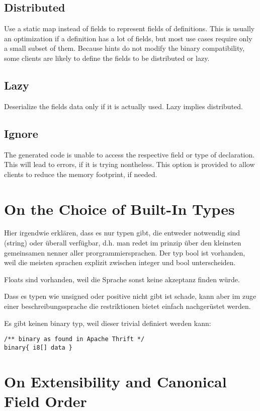 \documentclass[a4paper,10pt]{article}
\begin{document}
\subsection*{Distributed}
Use a static map instead of fields to represent fields of definitions. This is usually an optimization if a definition has a lot of fields, but most use cases require only a small subset of them. Because hints do not modify the binary compatibility, some clients are likely to define the fields to be distributed or lazy.

\subsection*{Lazy}
Deserialize the fields data only if it is actually used. Lazy implies distributed.

\subsection*{Ignore}
The generated code is unable to access the respective field or type of declaration. This will lead to errors, if it is trying nontheless. This option is provided to allow clients to reduce the memory footprint, if needed.

\section{On the Choice of Built-In Types}

Hier irgendwie erklären, dass es nur typen gibt, die entweder notwendig sind (string) oder überall verfügbar, d.h. man redet im prinzip über den kleinsten gemeinsamen nenner aller prorgrammiersprachen. Der typ bool ist vorhanden, weil die meisten sprachen explizit zwischen integer und bool unterscheiden.

Floats sind vorhanden, weil die Sprache sonst keine akzeptanz finden würde.

Dass es typen wie unsigned oder positive nicht gibt ist schade, kann aber im zuge einer beschreibungssprache die restriktionen bietet einfach nachgerüstet werden.

Es gibt keinen binary typ, weil dieser trivial definiert werden kann:
\begin{lstlisting}[label=thriftBinary,caption=Binary,language=skill]
/** binary as found in Apache Thrift */
binary{ i8[] data }
\end{lstlisting}


\section{On Extensibility and Canonical Field Order}
\end{document}
